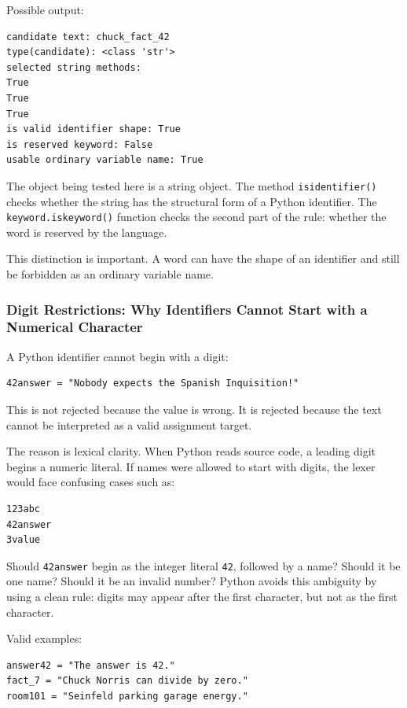 Possible output:

\begin{verbatim}
candidate text: chuck_fact_42
type(candidate): <class 'str'>
selected string methods:
True
True
True
is valid identifier shape: True
is reserved keyword: False
usable ordinary variable name: True
\end{verbatim}

The object being tested here is a string object. The method \texttt{isidentifier()} checks whether the string has the structural form of a Python identifier. The \texttt{keyword.iskeyword()} function checks the second part of the rule: whether the word is reserved by the language.

This distinction is important. A word can have the shape of an identifier and still be forbidden as an ordinary variable name.

\subsubsection{Digit Restrictions: Why Identifiers Cannot Start with a Numerical Character}

A Python identifier cannot begin with a digit:

\begin{verbatim}
42answer = "Nobody expects the Spanish Inquisition!"
\end{verbatim}

This is not rejected because the value is wrong. It is rejected because the text cannot be interpreted as a valid assignment target.

The reason is lexical clarity. When Python reads source code, a leading digit begins a numeric literal. If names were allowed to start with digits, the lexer would face confusing cases such as:

\begin{verbatim}
123abc
42answer
3value
\end{verbatim}

Should \texttt{42answer} begin as the integer literal \texttt{42}, followed by a name? Should it be one name? Should it be an invalid number? Python avoids this ambiguity by using a clean rule: digits may appear after the first character, but not as the first character.

Valid examples:

\begin{verbatim}
answer42 = "The answer is 42."
fact_7 = "Chuck Norris can divide by zero."
room101 = "Seinfeld parking garage energy."
\end{verbatim}


